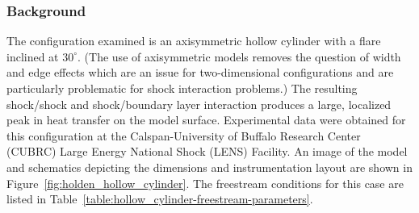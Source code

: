 \subsubsection{Background}
The configuration examined is an axisymmetric hollow cylinder with a flare inclined at $30^\circ$.  (The use of axisymmetric models removes the question of width and edge effects which are an issue for two-dimensional configurations and are particularly problematic for shock interaction problems.) The resulting shock/shock and shock/boundary layer interaction produces a large, localized peak in heat transfer on the model surface.  Experimental data were obtained for this configuration at the Calspan-University of Buffalo Research Center (CUBRC) Large Energy National Shock (LENS) Facility.  An image of the model and schematics depicting the dimensions and instrumentation layout are shown in Figure~\ref{fig:holden_hollow_cylinder}. The freestream conditions for this case are listed in Table~\ref{table:hollow_cylinder-freestream-parameters}.


